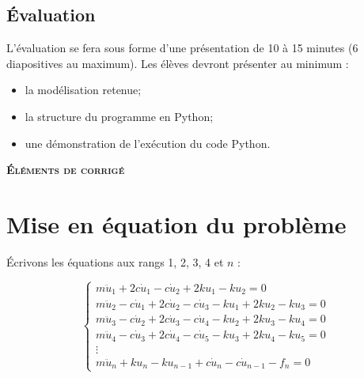 \documentclass[10pt,fleqn]{article} %
\begin{document}
\begin{multicols}{2}
\section{Évaluation}
L'évaluation se fera sous forme d'une présentation de 10 à 15 minutes (6 diapositives au maximum). Les élèves devront présenter au minimum : 
\begin{itemize}
\item la modélisation retenue;
\item la structure du programme en Python;
\item une démonstration de l'exécution du code Python.
\end{itemize}

\end{multicols}


\ifprof
\newpage

\setcounter{section}{0}
\begin{center}
\textsc\textbf{{Éléments de corrigé}}
\end{center}

\section{Mise en équation du problème}


Écrivons les équations aux rangs 1, 2, 3, 4 et $n$ :

$$
\left\{
\begin{array}{l}
m\ddot{u}_1 + 2c \dot{u}_1-c \dot{u}_{2}  +2 k u_{1} - k u_{2} =0 \\
m\ddot{u}_2 -c \dot{u}_{1} + 2c \dot{u}_2   -c \dot{u}_{3}- k u_{1} + 2 k u_2   - k u_{3}=0 \\
m\ddot{u}_3 -c \dot{u}_{2} + 2c \dot{u}_3   -c \dot{u}_{4}- k u_{2} + 2 k u_3   - k u_{4}=0 \\
m\ddot{u}_4 -c \dot{u}_{3} + 2c \dot{u}_4   -c \dot{u}_{5}- k u_{3} + 2 k u_4   - k u_{5}=0 \\
\vdots \\
m\ddot{u}_n +  k u_n - k u_{n-1} + c \dot{u}_n -c \dot{u}_{n-1} - f_n = 0
\end{array}
\right.
$$
\end{document}
